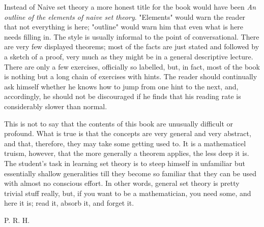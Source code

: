 Instead of Naive set theory a more honest title for the book would have been \textit{An outline of the elements of naive set theory}. "Elements" would warn the reader that not everything is here; "outline" would warn him that even what is here needs filling in. The style is usually informal to the point of conversational. There are very few displayed theorems; most of the facts are just stated and followed by a sketch of a proof, very much as they might be in a general descriptive lecture. There are only a few exercises, officially so labelled, but, in fact, most of the book is nothing but a long chain of exercises with hints. The reader should continually ask himself whether he knows how to jump from one hint to the next, and, accordingly, he should not be discouraged if he finds that his reading rate is considerably slower than normal. 

This is not to say that the contents of this book are unusually difficult or profound. What is true is that the concepts are very general and very abstract, and that, therefore, they may take some getting used to. It is a mathematicel truism, however, that the more generally a theorem applies, the less deep it is. The student's task in learning set theory is to steep himself in unfamiliar but essentially shallow generalities till they become so familiar that they can be used with almost no conscious effort. In other words, general set theory is pretty trivial stuff really, but, if you want to be a mathematician, you need some, and here it is; read it, absorb it, and forget it.

\begin{flushright}
P. R. H.
\end{flushright} 
